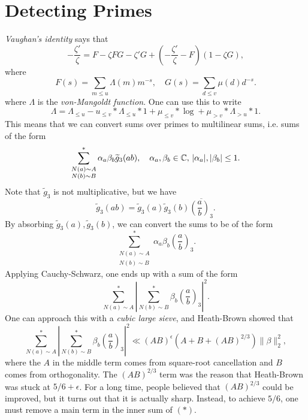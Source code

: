 \section{Detecting Primes}
\begin{remark}
  \emph{Vaughan's identity} says that
  \[
    -\frac{\zeta'}{\zeta} = F - \zeta FG - \zeta' G + \left(-\frac{\zeta'}{\zeta} - F\right)(1 - \zeta G),
  \]
  where
  \[
    F(s) = \sum_{m \le u} \Lambda(m) m^{-s},
    \quad G(s) = \sum_{d \le v} \mu(d) d^{-s}.
  \]
  where $\Lambda$ is the \emph{von-Mangoldt function}.
  One can use this to write
  \[
    \Lambda = \Lambda_{\le u} - u_{\le v} * \Lambda_{\le u} * 1
    + \mu_{\le v} * \log + \mu_{> v} * \Lambda_{> u} * 1.
  \]
  This means that we can convert sums over
  primes to multilinear sums, i.e. sums of the
  form
  \[
    \sum^*_{\substack{N(a) \sim A \\ N(b) \sim B}} \alpha_a \beta_b \widetilde{g}_3(ab),
    \quad \alpha_a, \beta_b \in \mathbb{C},\, |\alpha_a|, |\beta_b| \le 1.
  \]
  Note that $\widetilde{g}_3$ is not multiplicative, but we have
  \[
    \widetilde{g}_3(ab) = \widetilde{g}_3(a) \widetilde{g}_3(b) \overline{\left(\frac{a}{b}\right)_3}.
  \]
  By absorbing $\widetilde{g}_3(a), \widetilde{g}_3(b)$, we can convert the sums to be of the
  form
  \[
    \sum^*_{\substack{N(a) \sim A \\ N(b) \sim B}} \alpha_a \beta_b \left(\frac{a}{b}\right)_3.
  \]
  Applying Cauchy-Schwarz, one ends up with a
  sum of the form
  \[
    \sum_{N(a) \sim A}^* \left|\sum_{N(b) \sim B}^* \beta_b \left(\frac{a}{b}\right)_3\right|^2.
    \tag{$*$}
  \]
  One can approach this with a \emph{cubic large sieve}, and
  Heath-Brown showed that
  \[
    \sum_{N(a) \sim A}^* \left|\sum_{N(b) \sim B}^* \beta_b \left(\frac{a}{b}\right)_3\right|^2
    \ll (AB)^{\epsilon} (A + B + (AB)^{2 / 3}) \|\beta\|_{2}^2,
  \]
  where the $A$ in the middle term comes from
  square-root cancellation and $B$ comes
  from orthogonality. The $(AB)^{2 / 3}$
  term was the reason that Heath-Brown was
  stuck at $5 / 6 + \epsilon$. For a long
  time, people believed that
  $(AB)^{2 / 3}$ could be improved, but
  it turns out that it is actually sharp.
  Instead, to achieve $5 / 6$, one must
  remove a main term in the inner sum of $(*)$.
\end{remark}

